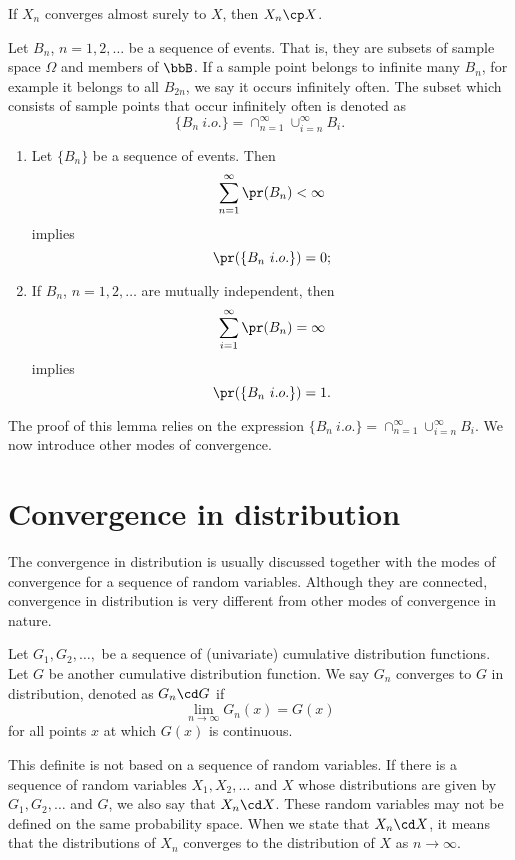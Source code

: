 \begin{theorem}
\label{thm11.1}
If $X_n$ converges almost surely to $X$, then $X_n \cp X$.
\end{theorem}

Let $B_n$, $n=1, 2, \ldots$ be a sequence of events. That is, they
are subsets of sample space $\Omega$ and members of $\bbB$.
If a sample point belongs to infinite many $B_n$, for example it belongs
to all $B_{2n}$, we say it occurs infinitely often. The subset
which consists of sample points that occur infinitely often
is denoted as 
\[  
\{B_n ~i.o.\} = \cap_{n=1}^\infty \cup_{i=n}^\infty B_i.
\]

\begin{theorem}
\label{BorelCantelli}

\begin{enumerate}
\item 
Let $\{B_n\}$ be a sequence of events. Then
\[ 
\sum_{n=1}^\infty \pr(B_n) < \infty
\]
implies
\[
\pr( \{B_n ~i.o.\}) = 0;
\]

\item 
If $B_n$, $n=1, 2, \ldots$ are mutually independent, then
\[
\sum_{i=1}^\infty \pr (B_n) = \infty 
\]
implies
\[
\pr( \{B_n ~i.o.\}) = 1.
\]
\end{enumerate}
\end{theorem}

The proof of this lemma relies on the expression
$\{B_n ~i.o.\} = \cap_{n=1}^\infty \cup_{i=n}^\infty B_i$.
We now introduce other modes of convergence.

\section{Convergence in distribution}
The convergence in distribution is usually discussed
together with the modes of convergence for a sequence of random
variables. Although they are connected, convergence in
distribution is very different from other modes of convergence
in nature.

\begin{defi}
Let $G_1, G_2, \ldots, $ be a sequence of (univariate) cumulative distribution
functions. Let $G$ be another cumulative distribution function.
We say $G_n$ converges to $G$ in distribution,
denoted as $G_n \cd G$ if
\[ 
\lim_{n \to \infty} G_n(x) = G(x) 
\]
for all points $x$ at which $G (x)$ is continuous.
\end{defi}

This definite is not based on a sequence of random variables. 
If there is a sequence of random variables $X_1, X_2, \ldots$ and $X$
whose distributions are given by $G_1, G_2, \ldots$ and $G$,
we also say that $X_n \cd X$. 
These random variables may not be defined on the same probability space.
When we state that $X_n \cd X$,
it means that the distributions of $X_n$ converges to the distribution
of $X$ as $n\to \infty$.

